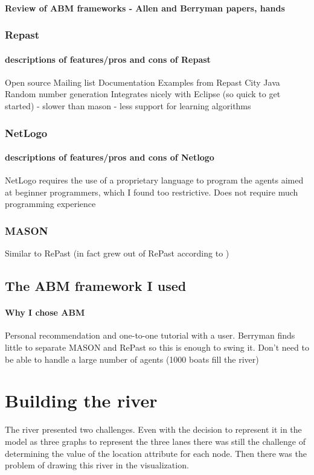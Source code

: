       \paragraph{Review of ABM frameworks - Allen and Berryman papers, hands}
      \subsubsection{Repast}
        \paragraph{descriptions of features/pros and cons of Repast}
        Open source
        Mailing list
        Documentation
        Examples from Repast City
        Java
        Random number generation
        Integrates nicely with Eclipse (so quick to get started)
        - slower than mason
        - less support for learning algorithms
      \subsubsection{NetLogo}
        \paragraph{descriptions of features/pros and cons of Netlogo}
        NetLogo requires the use of a proprietary
        language to program the agents aimed at beginner programmers, which I
        found too restrictive.
        Does not require much programming experience
        
      \subsubsection{MASON}
        Similar to RePast (in fact grew out of RePast according to )
    \subsection{The ABM framework I used}
      \paragraph{Why I chose ABM}
      Personal recommendation and one-to-one tutorial with a user. Berryman finds little to separate MASON and RePast so this is enough to swing it.
      Don't need to be able to handle a large number of agents (1000 boats fill the river)
      
  \section{Building the river}\label{techissues:river}
    The river presented two challenges. Even with the decision to represent it in the model as three graphs to represent the three lanes there was still the challenge of determining the value of the location attribute for each node. Then there was the problem of drawing this river in the visualization.
    
